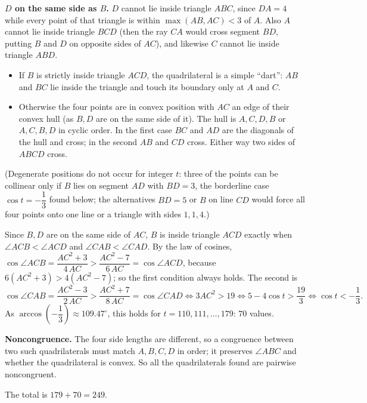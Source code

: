 \textbf{$D$ on the same side as $B$.} $D$ cannot lie inside triangle $ABC$, since $DA=4$ while every point of that triangle is within $\max(AB,AC)<3$ of $A$. Also $A$ cannot lie inside triangle $BCD$ (then the ray $CA$ would cross segment $BD$, putting $B$ and $D$ on opposite sides of $AC$), and likewise $C$ cannot lie inside triangle $ABD$.
\begin{itemize}
\item If $B$ is strictly inside triangle $ACD$, the quadrilateral is a simple ``dart'': $AB$ and $BC$ lie inside the triangle and touch its boundary only at $A$ and $C$.
\item Otherwise the four points are in convex position with $AC$ an edge of their convex hull (as $B,D$ are on the same side of it). The hull is $A,C,D,B$ or $A,C,B,D$ in cyclic order. In the first case $BC$ and $AD$ are the diagonals of the hull and cross; in the second $AB$ and $CD$ cross. Either way two sides of $ABCD$ cross.
\end{itemize}
(Degenerate positions do not occur for integer $t$: three of the points can be collinear only if $B$ lies on segment $AD$ with $BD=3$, the borderline case $\cos t=-\dfrac{1}{3}$ found below; the alternatives $BD=5$ or $B$ on line $CD$ would force all four points onto one line or a triangle with sides $1,1,4$.)

Since $B,D$ are on the same side of $AC$, $B$ is inside triangle $ACD$ exactly when $\angle ACB<\angle ACD$ and $\angle CAB<\angle CAD$. By the law of cosines, $\cos\angle ACB=\dfrac{AC^2+3}{4\,AC}>\dfrac{AC^2-7}{6\,AC}=\cos\angle ACD$, because $6(AC^2+3)>4(AC^2-7)$; so the first condition always holds. The second is
\[
\cos\angle CAB=\dfrac{AC^2-3}{2\,AC}>\dfrac{AC^2+7}{8\,AC}=\cos\angle CAD\iff 3AC^2>19\iff 5-4\cos t>\dfrac{19}{3}\iff\cos t<-\dfrac{1}{3} .
\]
As $\arccos\left(-\dfrac{1}{3}\right)\approx109.47^\circ$, this holds for $t=110,111,\ldots,179$: $70$ values.

\textbf{Noncongruence.} The four side lengths are different, so a congruence between two such quadrilaterals must match $A,B,C,D$ in order; it preserves $\angle ABC$ and whether the quadrilateral is convex. So all the quadrilaterals found are pairwise noncongruent.

The total is $179+70=\boxed{249}$.
